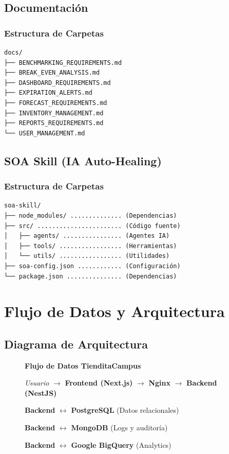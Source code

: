 \documentclass[12pt,a4paper]{article}
\begin{document}
\subsection{Documentación}

\subsubsection{Estructura de Carpetas}

\begin{verbatim}
docs/
├── BENCHMARKING_REQUIREMENTS.md
├── BREAK_EVEN_ANALYSIS.md
├── DASHBOARD_REQUIREMENTS.md
├── EXPIRATION_ALERTS.md
├── FORECAST_REQUIREMENTS.md
├── INVENTORY_MANAGEMENT.md
├── REPORTS_REQUIREMENTS.md
└── USER_MANAGEMENT.md
\end{verbatim}

\subsection{SOA Skill (IA Auto-Healing)}

\subsubsection{Estructura de Carpetas}

\begin{verbatim}
soa-skill/
├── node_modules/ .............. (Dependencias)
├── src/ ....................... (Código fuente)
│   ├── agents/ ................ (Agentes IA)
│   ├── tools/ ................. (Herramientas)
│   └── utils/ ................. (Utilidades)
├── soa-config.json ............ (Configuración)
└── package.json ............... (Dependencias)
\end{verbatim}

\section{Flujo de Datos y Arquitectura}

\subsection{Diagrama de Arquitectura}
\begin{figure}[h]
\centering
\begin{minipage}{0.8\textwidth}
\textbf{Flujo de Datos TienditaCampus}

\textit{Usuario} $\rightarrow$ \textbf{Frontend (Next.js)} $\rightarrow$ \textbf{Nginx} $\rightarrow$ \textbf{Backend (NestJS)}

\textbf{Backend} $\leftrightarrow$ \textbf{PostgreSQL} (Datos relacionales)

\textbf{Backend} $\leftrightarrow$ \textbf{MongoDB} (Logs y auditoría)

\textbf{Backend} $\leftrightarrow$ \textbf{Google BigQuery} (Analytics)
\end{minipage}
\end{figure}
\end{document}
